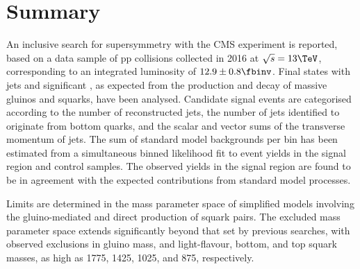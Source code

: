 \section{Summary}
\label{sec:summary}

An inclusive search for supersymmetry with the CMS experiment is
reported, based on a data sample of pp collisions collected in 2016 at
$\sqrt{s} = 13\TeV$, corresponding to an integrated luminosity of
$12.9 \pm 0.8 \fbinv$. Final states with jets and significant
\ptvecmiss, as expected from the production and decay of massive
gluinos and squarks, have been analysed. Candidate signal events are
categorised according to the number of reconstructed jets, the number
of jets identified to originate from bottom quarks, and the scalar and
vector sums of the transverse momentum of jets. The sum of standard
model backgrounds per bin has been estimated from a simultaneous
binned likelihood fit to event yields in the signal region and control
samples. The observed yields in the signal region are found to be in
agreement with the expected contributions from standard model
processes.

Limits are determined in the mass parameter space of simplified models
involving the gluino-mediated and direct production of squark
pairs. The excluded mass parameter space extends significantly beyond
that set by previous searches, with observed exclusions in gluino
mass, and light-flavour, bottom, and top squark masses, as high as
1775, 1425, 1025, and 875\GeV, respectively.

